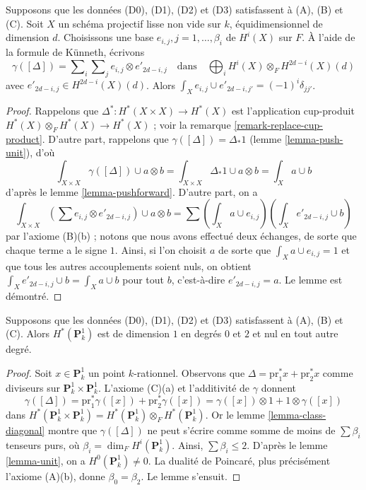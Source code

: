 \begin{lemma}
\label{lemma-class-diagonal}
Supposons que les données (D0), (D1), (D2) et (D3) satisfassent à (A), (B) et (C).
Soit $X$ un schéma projectif lisse non vide sur $k$, équidimensionnel
de dimension $d$. Choisissons une base $e_{i, j}, j = 1, \ldots, \beta_i$ de
$H^i(X)$ sur $F$. À l'aide de la formule de K\"unneth, écrivons
$$
\gamma([\Delta]) =
\sum\nolimits_i
\sum\nolimits_j e_{i, j} \otimes e'_{2d - i , j}
\quad\text{dans}\quad
\bigoplus\nolimits_i H^i(X) \otimes_F H^{2d - i}(X)(d)
$$
avec $e'_{2d - i, j} \in H^{2d - i}(X)(d)$.
Alors $\int_X e_{i, j} \cup e'_{2d - i, j'} = (-1)^i\delta_{jj'}$.
\end{lemma}

\begin{proof}
Rappelons que $\Delta^* : H^*(X \times X) \to H^*(X)$ est l'application
cup-produit $H^*(X) \otimes_F H^*(X) \to H^*(X)$ ; voir
la remarque \ref{remark-replace-cup-product}. D'autre part,
rappelons que $\gamma([\Delta]) = \Delta_*1$ (lemme \ref{lemma-push-unit}),
d'où
$$
\int_{X \times X} \gamma([\Delta]) \cup a \otimes b =
\int_{X \times X} \Delta_*1 \cup a \otimes b =
\int_X a \cup b
$$
d'après le lemme \ref{lemma-pushforward}.
D'autre part, on a
$$
\int_{X \times X} (\sum e_{i, j} \otimes e'_{2d -i , j}) \cup a \otimes b =
\sum (\int_X a \cup e_{i, j})(\int_X e'_{2d - i, j} \cup b)
$$
par l'axiome (B)(b) ; notons que nous avons effectué deux échanges, de sorte que
chaque terme a le signe $1$. Ainsi, si l'on choisit $a$ de sorte que
$\int_X a \cup e_{i, j} = 1$ et que tous les autres accouplements soient nuls,
on obtient $\int_X e'_{2d - i, j} \cup b = \int_X a \cup b$
pour tout $b$, c'est-à-dire $e'_{2d - i, j} = a$. Le lemme est démontré.
\end{proof}

\begin{lemma}
\label{lemma-cohomology-P1}
Supposons que les données (D0), (D1), (D2) et (D3) satisfassent à (A), (B) et (C).
Alors $H^*(\mathbf{P}^1_k)$ est de dimension $1$ en degrés $0$ et $2$
et nul en tout autre degré.
\end{lemma}

\begin{proof}
Soit $x \in \mathbf{P}^1_k$ un point $k$-rationnel. Observons que
$\Delta = \text{pr}_1^*x + \text{pr}_2^*x$ comme diviseurs sur
$\mathbf{P}^1_k \times \mathbf{P}^1_k$. L'axiome (C)(a)
et l'additivité de $\gamma$ donnent
$$
\gamma([\Delta]) =
\text{pr}_1^*\gamma([x]) +
\text{pr}_2^*\gamma([x]) =
\gamma([x]) \otimes 1 + 1 \otimes \gamma([x])
$$
dans $H^*(\mathbf{P}^1_k \times \mathbf{P}^1_k) =
H^*(\mathbf{P}^1_k) \otimes_F H^*(\mathbf{P}^1_k)$.
Or le lemme \ref{lemma-class-diagonal}
montre que $\gamma([\Delta])$ ne peut s'écrire
comme somme de moins de $\sum \beta_i$ tenseurs purs,
où $\beta_i = \dim_F H^i(\mathbf{P}^1_k)$.
Ainsi, $\sum \beta_i \leq 2$.
D'après le lemme \ref{lemma-unit}, on a $H^0(\mathbf{P}^1_k) \not = 0$.
La dualité de Poincar\'e, plus précisément l'axiome (A)(b),
donne $\beta_0 = \beta_2$. Le lemme s'ensuit.
\end{proof}

